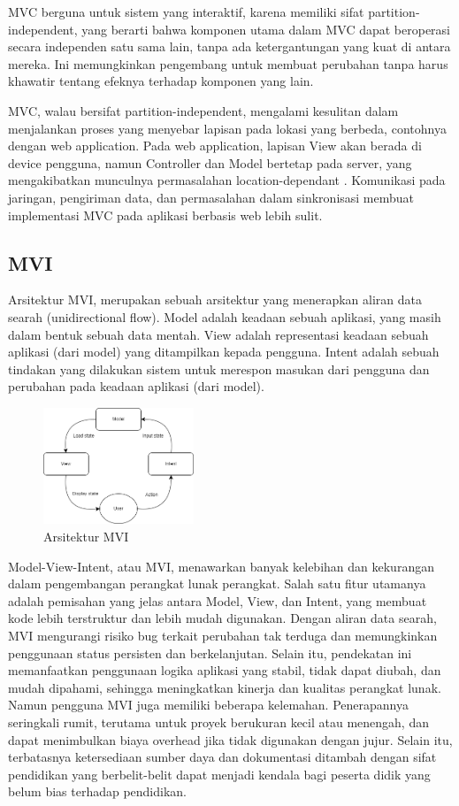 \documentclass[conference]{IEEEtran}
\begin{document}
MVC berguna untuk sistem yang interaktif, karena memiliki sifat partition-independent, yang berarti bahwa komponen utama dalam MVC dapat beroperasi secara independen satu sama lain, tanpa ada ketergantungan yang kuat di antara mereka. Ini memungkinkan pengembang untuk membuat perubahan tanpa harus khawatir tentang efeknya terhadap komponen yang lain.

MVC, walau bersifat partition-independent, mengalami kesulitan dalam menjalankan proses yang menyebar lapisan pada lokasi yang berbeda, contohnya dengan web application. Pada web application, lapisan View akan berada di device pengguna, namun Controller dan Model bertetap pada server, yang mengakibatkan munculnya permasalahan location-dependant \cite{leff2001web}. Komunikasi pada jaringan, pengiriman data, dan permasalahan dalam sinkronisasi membuat implementasi MVC pada aplikasi berbasis web lebih sulit.


\subsection{MVI}
Arsitektur  MVI,  merupakan  sebuah  arsitektur  yang  menerapkan  aliran  data  searah (unidirectional flow). Model adalah keadaan sebuah aplikasi, yang masih dalam bentuk sebuah data mentah. View adalah representasi keadaan sebuah aplikasi (dari model) yang ditampilkan kepada  pengguna.  Intent  adalah  sebuah  tindakan  yang  dilakukan  sistem  untuk  merespon masukan dari pengguna  dan  perubahan  pada  keadaan  aplikasi  (dari  model). 

\begin{figure}[h]
    \centering
    \includegraphics[width = 0.4\textwidth]{images/MVI1.png}
    \caption{Arsitektur MVI}
    \label{fig:enter-label}
\end{figure}

Model-View-Intent, atau MVI, menawarkan banyak kelebihan dan kekurangan dalam pengembangan perangkat lunak perangkat. Salah satu fitur utamanya adalah pemisahan yang jelas antara Model, View, dan Intent, yang membuat kode lebih terstruktur dan lebih mudah digunakan. Dengan aliran data searah, MVI mengurangi risiko bug terkait perubahan tak terduga dan memungkinkan penggunaan status persisten dan berkelanjutan. Selain itu, pendekatan ini memanfaatkan penggunaan logika aplikasi yang stabil, tidak dapat diubah, dan mudah dipahami, sehingga meningkatkan kinerja dan kualitas perangkat lunak. Namun pengguna MVI juga memiliki beberapa kelemahan. Penerapannya seringkali rumit, terutama untuk proyek berukuran kecil atau menengah, dan dapat menimbulkan biaya overhead jika tidak digunakan dengan jujur. Selain itu, terbatasnya ketersediaan sumber daya dan dokumentasi ditambah dengan sifat pendidikan yang berbelit-belit dapat menjadi kendala bagi peserta didik yang belum bias terhadap pendidikan.
\end{document}
